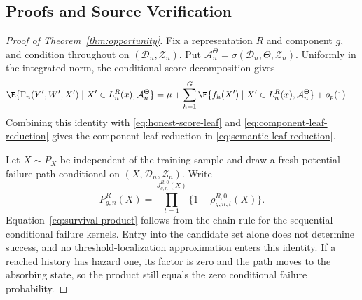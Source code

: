 \begin{appendix}

\section{Proofs and Source Verification}\label{app:proofs}

\begin{proof}[Proof of Theorem~\ref{thm:opportunity}]
Fix a representation \(R\) and component \(g\), and condition throughout on
\((\mathcal D_n,\mathcal Z_n)\). Put
\(\mathcal A_n^\Theta=\sigma(\mathcal D_n,\Theta,\mathcal Z_n)\). Uniformly in
the integrated norm, the conditional score decomposition gives
\begin{align*}
\E\{\Gamma_n(Y',W',X')\mid X'\in L_n^R(x),\mathcal A_n^\Theta\}
&=\mu+\sum_{h=1}^G
\E\{f_h(X')\mid X'\in L_n^R(x),\mathcal A_n^\Theta\}+o_p(1).
\end{align*}
Combining this identity with
\eqref{eq:honest-score-leaf} and \eqref{eq:component-leaf-reduction} gives the
component leaf reduction in \eqref{eq:semantic-leaf-reduction}.

Let \(X\sim P_X\) be independent of the training sample and draw a fresh
potential failure path conditional on \((X,\mathcal D_n,\mathcal Z_n)\). Write
\begin{equation*}
P_{g,n}^R(X)=
\prod_{t=1}^{J_{g,n}^{R,0}(X)}
\{1-\rho_{g,n,t}^{R,0}(X)\}.
\end{equation*}
Equation~\eqref{eq:survival-product} follows from the chain rule for the
sequential conditional failure kernels. Entry into the candidate set alone does
not determine success, and no threshold-localization approximation enters this
identity. If a reached history has hazard one, its factor is zero and the path
moves to the absorbing state, so the product still equals the zero conditional
failure probability.


\end{proof}
\end{appendix}
